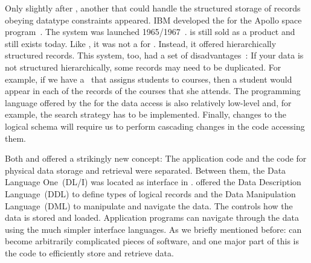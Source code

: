 Only slightly after , another  that could handle the structured storage of records obeying datatype constraints appeared.
IBM developed the  for the Apollo space program~\cite{KLBGNLWBS2012ITIYCGTIIMS}.
The system was launched 1965/1967~\cite{BBP2007TBOI}.
 is still sold as a product and still exists today.
Like , it was not a  for \emph{}.
Instead, it offered hierarchically structured records.
This system, too, had a set of disadvantages~\cite{KC2024DS:ITD}:
If your data is not structured hierarchically, some records may need to be duplicated.
For example, if we have a \db\ that assigns students to courses, then a student would appear in each of the records of the courses that she attends.
The programming language offered by the  for the data access is also relatively low-level and, for example, the search strategy has to be implemented.
Finally, changes to the logical schema will require us to perform cascading changes in the code accessing them.

Both  and  offered a strikingly new concept:
The application code and the code for physical data storage and retrieval were separated.
Between them, the Data Language One~(DL/I) was located as interface in .
 offered the Data Description Language~(DDL) to define types of logical records and the Data Manipulation Language~(DML) to manipulate and navigate the data.
The  controls how the data is stored and loaded.
Application programs can navigate through the data using the much simpler interface languages.
As we briefly mentioned before:  can become arbitrarily complicated pieces of software, and one major part of this is the code to efficiently store and retrieve data.

